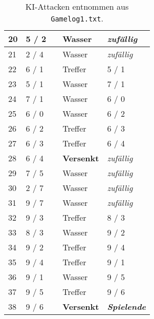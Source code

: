 \begin{table}[H]
\begin{tabular}{|l|p{}|p{}|p{}|p{}|}
		20	& 5 / 2						& \checkmark					& Wasser	& \emph{zufällig}						\\ \hline
		21	& 2 / 4						& \checkmark					& Wasser	& \emph{zufällig}						\\ \hline
		22	& 6 / 1						& \checkmark					& Treffer	& 5 / 1									\\ \hline
		23	& 5 / 1						& \checkmark					& Wasser	& 7 / 1									\\ \hline
		24	& 7 / 1						& \checkmark					& Wasser	& 6 / 0									\\ \hline
		25	& 6 / 0						& \checkmark					& Wasser	& 6 / 2									\\ \hline
		26	& 6 / 2						& \checkmark					& Treffer	& 6 / 3									\\ \hline
		27	& 6 / 3						& \checkmark					& Treffer	& 6 / 4									\\ \hline
		28	& 6 / 4						& \checkmark					& \textbf{Versenkt}	& \emph{zufällig}						\\ \hline
		29	& 7 / 5						& \checkmark					& Wasser	& \emph{zufällig}						\\ \hline
		30	& 2 / 7						& \checkmark					& Wasser	& \emph{zufällig}						\\ \hline
		31	& 9 / 7						& \checkmark					& Wasser	& \emph{zufällig}						\\ \hline
		32	& 9 / 3						& \checkmark					& Treffer	& 8 / 3									\\ \hline
		33	& 8 / 3						& \checkmark					& Wasser	& 9 / 2									\\ \hline
		34	& 9 / 2						& \checkmark					& Treffer	& 9 / 4									\\ \hline
		35	& 9 / 4						& \checkmark					& Treffer	& 9 / 1									\\ \hline
		36	& 9 / 1						& \checkmark					& Wasser	& 9 / 5									\\ \hline
		37	& 9 / 5						& \checkmark					& Treffer	& 9 / 6									\\ \hline
		38	& 9 / 6						& \checkmark					& \textbf{Versenkt}	& \emph{\textbf{Spielende}}						\\ \hline
	\end{tabular}
	\caption{KI-Attacken entnommen aus \texttt{Gamelog1.txt}.}
	\label{tbl:testfall3}
\end{table}
